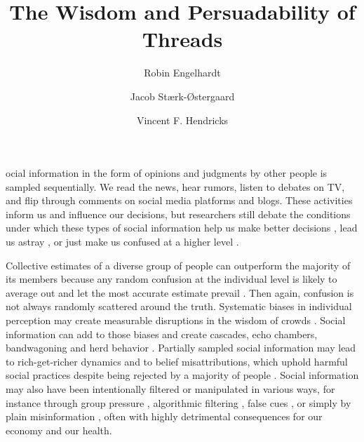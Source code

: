 \documentclass[9pt,twocolumn,twoside,lineno]{pnas-new}
\title{The Wisdom and Persuadability of Threads}
\author[a,1]{Robin Engelhardt}
\author[a]{Jacob Stærk-Østergaard}
\author[a]{Vincent F. Hendricks}
\affil[a]{Center for Information and Bubble Studies, Department of Communication, University of Copenhagen, Karen Blixens Plads 8, DK-2300 Copenhagen S.}
\begin{document}
\maketitle
\thispagestyle{firststyle}

ocial information in the form of opinions and judgments by other people is sampled sequentially. We read the news, hear rumors, listen to debates on TV, and flip through comments on social media platforms and blogs. These activities inform us and influence our decisions, but researchers still debate the conditions under which these types of social information help us make better decisions \cite{woolley2010evidence, gurccay2015power, becker2017network, jayles2017social}, lead us astray \cite{caplan2011myth, lorenz2011social, minson2012cost, king2011true, le2018endogenous}, or just make us confused at a higher level \cite{salganik2006experimental, salganik2009web}.

Collective estimates of a diverse group of people can outperform the majority of its members because any random confusion at the individual level is likely to average out and let the most accurate estimate prevail \cite{galton1907vox, muth1961rational, surowiecki2005wisdom, hong2008some}. Then again, confusion is not always randomly scattered around the truth. Systematic biases in individual perception may create measurable disruptions in the wisdom of crowds \cite{izard2008calibrating, nash2014curious, kao2018counteracting}. Social information can add to those biases and create cascades, echo chambers, bandwagoning and herd behavior \cite{anderson1997information, bikhchandani1992theory, bakshy2015exposure, banerjee1992simple}. Partially sampled social information may lead to rich-get-richer dynamics \cite{barabasi1999emergence} and to belief misattributions, which uphold harmful social practices despite being rejected by a majority of people \cite{katz1931students, darley1968bystander, ross1977false, noelle1974spiral, lee2019homophily}. Social information may also have been intentionally filtered or manipulated in various ways, for instance through group pressure \cite{asch1951effects}, algorithmic filtering \cite{pariser2011filter}, false cues \cite{salganik2006experimental, muchnik2013social, hanson1996hits}, or simply by plain misinformation \cite{hendricks2018reality}, often with highly detrimental consequences for our economy and our health.
\end{document}

